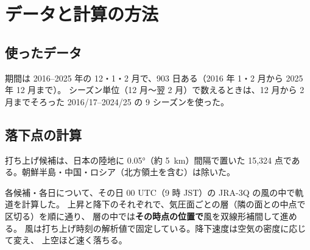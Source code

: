 \section{データと計算の方法}
\label{sec:method}

\subsection{使ったデータ}

\begin{center}
\small
{}
\end{center}

期間は 2016--2025 年の 12・1・2 月で、903 日ある（2016 年 1・2 月から 2025 年 12 月まで）。
シーズン単位（12 月〜翌 2 月）で数えるときは、12 月から 2 月までそろった 2016/17--2024/25 の
9 シーズンを使った。

\subsection{落下点の計算}

打ち上げ候補は、日本の陸地に \ang{0.05}（約 \SI{5}{\kilo\metre}）間隔で置いた
15{,}324 点である。朝鮮半島・中国・ロシア（北方領土を含む）は除いた。

各候補・各日について、その日 00 UTC（9 時 JST）の JRA-3Q の風の中で軌道を計算した。
上昇と降下のそれぞれで、気圧面ごとの層（隣の面との中点で区切る）を順に通り、
層の中では\textbf{その時点の位置で}風を双線形補間して進める。
風は打ち上げ時刻の解析値で固定している。降下速度は空気の密度に応じて変え、
上空ほど速く落ちる。

